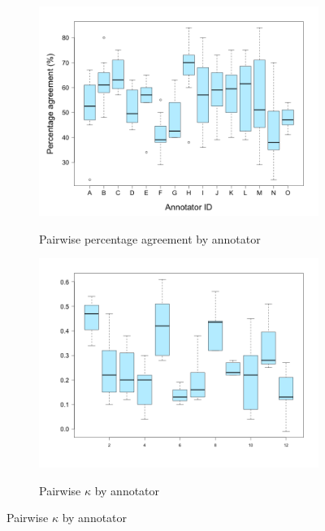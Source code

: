 		\begin{figure}[phtb]
			\centering
			
			

			\begin{subfigure}{\textwidth}
				\centering
				\caption{Pairwise percentage agreement by annotator}
				\includegraphics[width=.9\textwidth]{img/plots/pairwisePercentageByAnnotator-noTitle}
				\label{fig:agreement:annotators:pct}
			\end{subfigure}%

			\vspace{1em}			
			
			\begin{subfigure}{\textwidth}
				\centering
				\caption{Pairwise $\kappa$ by annotator}
				\includegraphics[width=.9\textwidth]{img/plots/pairwiseKappaByAnnotator-noTitle}
				\label{fig:agreement:annotators:k}
			\end{subfigure}%
			

\end{figure}
